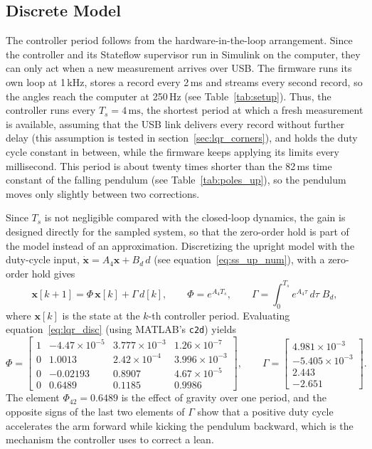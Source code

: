 \documentclass[a4paper,11pt]{article}
\begin{document}
\subsection{Discrete Model}
\label{sec:lqr_disc}
The controller period follows from the hardware-in-the-loop arrangement. Since the controller and its Stateflow supervisor run in Simulink on the computer, they can only act when a new measurement arrives over USB. The firmware runs its own loop at 1\,kHz, stores a record every 2\,ms and streams every second record, so the angles reach the computer at 250\,Hz (see Table~\ref{tab:setup}). Thus, the controller runs every $T_s = 4\,\mathrm{ms}$, the shortest period at which a fresh measurement is available, assuming that the USB link delivers every record without further delay (this assumption is tested in section~\ref{sec:lqr_corners}), and holds the duty cycle constant in between, while the firmware keeps applying its limits every millisecond. This period is about twenty times shorter than the 82\,ms time constant of the falling pendulum (see Table~\ref{tab:poles_up}), so the pendulum moves only slightly between two corrections.

Since $T_s$ is not negligible compared with the closed-loop dynamics, the gain is designed directly for the sampled system, so that the zero-order hold is part of the model instead of an approximation. Discretizing the upright model with the duty-cycle input, $\dot{\mathbf{x}} = A_4\mathbf{x} + B_d\, d$ (see equation~\ref{eq:ss_up_num}), with a zero-order hold gives
\begin{equation}
  \mathbf{x}[k+1] = \Phi\,\mathbf{x}[k] + \Gamma\, d[k], \qquad
  \Phi = e^{A_4 T_s}, \qquad \Gamma = \int_0^{T_s} e^{A_4 \tau}\, d\tau\; B_d ,
  \label{eq:lqr_disc}
\end{equation}
where $\mathbf{x}[k]$ is the state at the $k$-th controller period. Evaluating equation~\ref{eq:lqr_disc} (using MATLAB's \texttt{c2d}) yields
\begin{equation}
  \Phi = \begin{bmatrix}
  1 & -4.47\times10^{-5} & 3.777\times10^{-3} & 1.26\times10^{-7}\\
  0 & 1.0013 & 2.42\times10^{-4} & 3.996\times10^{-3}\\
  0 & -0.02193 & 0.8907 & 4.67\times10^{-5}\\
  0 & 0.6489 & 0.1185 & 0.9986
  \end{bmatrix}, \qquad
  \Gamma = \begin{bmatrix} 4.981\times10^{-3} \\ -5.405\times10^{-3} \\ 2.443 \\ -2.651 \end{bmatrix}.
  \label{eq:lqr_disc_num}
\end{equation}
The element $\Phi_{42} = 0.6489$ is the effect of gravity over one period, and the opposite signs of the last two elements of $\Gamma$ show that a positive duty cycle accelerates the arm forward while kicking the pendulum backward, which is the mechanism the controller uses to correct a lean.
\end{document}
